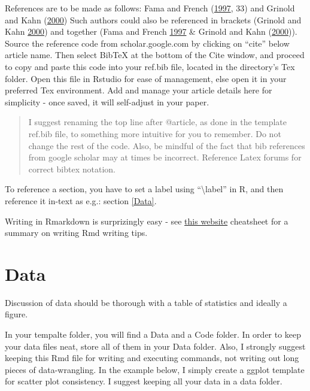 \documentclass[11pt,preprint, authoryear]{elsarticle}
\numberwithin{equation}{section}
\numberwithin{figure}{section}
\numberwithin{table}{section}
\begin{document}
References are to be made as follows: Fama and French
(\protect\hyperlink{ref-fama1997}{1997}, 33) and Grinold and Kahn
(\protect\hyperlink{ref-grinold2000}{2000}) Such authors could also be
referenced in brackets (Grinold and Kahn
\protect\hyperlink{ref-grinold2000}{2000}) and together (Fama and French
\protect\hyperlink{ref-fama1997}{1997} \& Grinold and Kahn
(\protect\hyperlink{ref-grinold2000}{2000})). Source the reference code
from scholar.google.com by clicking on ``cite'' below article name. Then
select BibTeX at the bottom of the Cite window, and proceed to copy and
paste this code into your ref.bib file, located in the directory's Tex
folder. Open this file in Rstudio for ease of management, else open it
in your preferred Tex environment. Add and manage your article details
here for simplicity - once saved, it will self-adjust in your paper.

\begin{quote}
I suggest renaming the top line after @article, as done in the template
ref.bib file, to something more intuitive for you to remember. Do not
change the rest of the code. Also, be mindful of the fact that bib
references from google scholar may at times be incorrect. Reference
Latex forums for correct bibtex notation.
\end{quote}

To reference a section, you have to set a label using
``\textbackslash{}label'' in R, and then reference it in-text as e.g.:
section \ref{Data}.

Writing in Rmarkdown is surprizingly easy - see
\href{https://www.rstudio.com/wp-content/uploads/2015/03/rmarkdown-reference.pdf}{this
website} cheatsheet for a summary on writing Rmd writing tips.

\section{\texorpdfstring{Data \label{Data}}{Data }}\label{data}

Discussion of data should be thorough with a table of statistics and
ideally a figure.

In your tempalte folder, you will find a Data and a Code folder. In
order to keep your data files neat, store all of them in your Data
folder. Also, I strongly suggest keeping this Rmd file for writing and
executing commands, not writing out long pieces of data-wrangling. In
the example below, I simply create a ggplot template for scatter plot
consistency. I suggest keeping all your data in a data folder.
\end{document}

